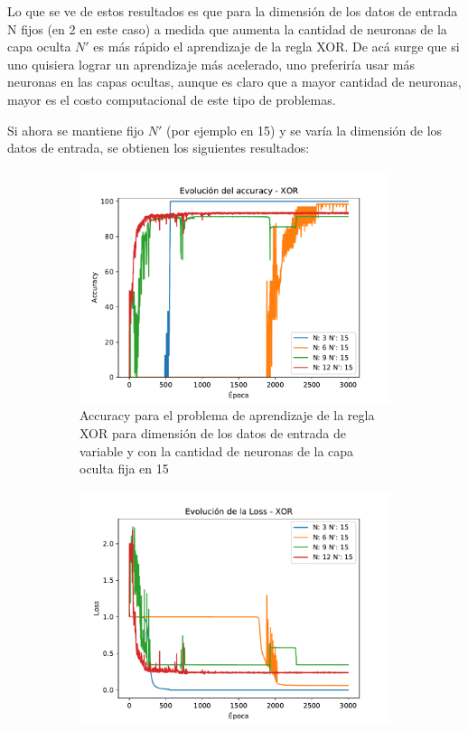 Lo que se ve de estos resultados es que para la dimensión de los datos de entrada N fijos (en 2 en este caso) a medida que aumenta la cantidad de neuronas de la capa oculta $N'$ es más rápido el aprendizaje de la regla XOR. De acá surge que si uno quisiera lograr un aprendizaje más acelerado, uno preferiría usar más neuronas en las capas ocultas, aunque es claro que a mayor cantidad de neuronas, mayor es el costo computacional de este tipo de problemas.

Si ahora se mantiene fijo $N'$ (por ejemplo en 15) y se varía la dimensión de los datos de entrada, se obtienen los siguientes resultados:

\begin{figure}[H]
     \centering
     \begin{subfigure}[b]{0.45\textwidth}
         \centering
         \includegraphics[width=\textwidth]{image/NvsNp_acc2.pdf}
         \caption{Accuracy para el problema de aprendizaje de la regla XOR  para dimensión de los datos de entrada de variable y con la cantidad de neuronas de la capa oculta fija en 15}
         \label{fig:acc6a}
     \end{subfigure}
     \hfill
     \begin{subfigure}[b]{0.45\textwidth}
         \centering
         \includegraphics[width=\textwidth]{image/NvsNp_loss2.pdf}

\end{subfigure}
\end{figure}
